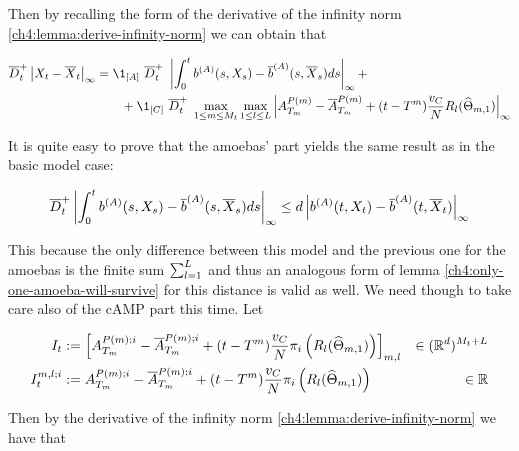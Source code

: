 Then by recalling the form of the derivative of the infinity norm \ref{ch4:lemma:derive-infinity-norm} we can obtain that

\begin{align*}
	\diniu_t^+
	\norm{\sol_t-\mfsol_t}_\infty 
	&=
	\1_{[\amba]}\
	\diniu_t^+\
	\norm{
		\int_0^t \drift^{(A)}(s, \sol_s) - \mfdrift^{(\amba)}(s, \mfsol_s) d s
	}_\infty + 
	\\
	&\qquad
	+ 
	\1_{[\camp]}\
	\diniu_t^+\
	\max_{1\leq m \leq \hmactive_t}	
	\max_{1\leq l \leq \NumCampRelease}
	\norm{
		\amba_{\btime_{m}}^{\Parentof(m)} 
		- \mfamba_{\btime_{m}}^{\Parentof(m)}
		+ (t - \btime^{m}) \frac{\cdrift}{N}  \rotation_l (\cgonia_{m,1})
	}_\infty
\end{align*}

It is quite easy to prove that the amoebas' part yields the same result as in the basic model case:

\begin{equation*}
	\overline{D}_t^+ \left| 
		\int_0^t b^{(A)}(s, X_s) - \overline{b}^{(A)}(s, \overline{X}_s) d s
	 \right|_\infty 
	\leq
	d \left| 
		b^{(A)}(t, X_t) - \overline{b}^{(A)}(t, \overline{X}_t)
	 \right|_\infty 
\end{equation*}

This because the only difference between this model and the previous one for the amoebas is the finite sum $\sum_{l =1}^{L}$ and thus an analogous form of lemma \ref{ch4:only-one-amoeba-will-survive} for this distance is valid as well.
We need though to take care also of the cAMP part this time.
Let

\begin{align*}
	I_t &:= \left[
	A_{T_{m}}^{P(m);i} 
	- \overline{A}_{T_{m}}^{P(m);i} 
	+ (t - T^{m}) \frac{v_C}{N}  \pi_i \left(R_l (\widehat{\Theta}_{m,1}) \right)
	\right]_{m,l}
		 &\in (\mathbb{R}^d)^{M_t + L}
	\\	
	I^{m,l;i}_t &:= 
		A_{T_{m}}^{P(m);i} 
		- \overline{A}_{T_{m}}^{P(m);i} 
		+ (t - T^{m}) \frac{v_C}{N}  \pi_i \left(R_l (\widehat{\Theta}_{m,1}) \right)
		 &\in \mathbb{R}
\end{align*}

Then by the derivative of the infinity norm \ref{ch4:lemma:derive-infinity-norm} we have that

